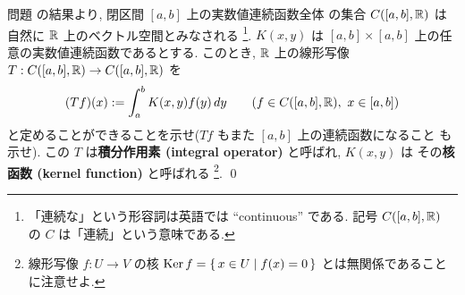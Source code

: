 \documentclass[12pt,twoside]{jarticle}
\begin{document}

\begin{question}[積分作用素]
  問題  の結果より, 閉区間 $[a,b]$ 上の実数値連続函数全体
  の集合 $C([a,b],{\mathbb R})$ は自然に ${\mathbb R}$ 上のベクトル空間とみなされる%
  \footnote{「連続な」という形容詞は英語では ``continuous'' である.
    記号 $C([a,b],{\mathbb R})$ の $C$ は「連続」という意味である.}.
  $K(x,y)$ は $[a,b]\times[a,b]$ 上の任意の実数値連続函数であるとする.
  このとき, ${\mathbb R}$ 上の線形写像 $T:C([a,b],{\mathbb R})\to C([a,b],{\mathbb R})$ を
  \begin{equation*}
    (Tf)(x) := \int_a^b K(x,y)f(y)\,dy
    \qquad (f\in C([a,b],{\mathbb R}),\ x\in [a,b])
  \end{equation*}
  と定めることができることを示せ($Tf$ もまた $[a,b]$ 上の連続函数になること
  も示せ).
  この $T$ は{\bf 積分作用素 (integral operator)} と呼ばれ, $K(x,y)$ は
  その{\bf 核函数 (kernel function)} と呼ばれる%
  \footnote{線形写像 $f:U\to V$ の核 $\mathop{\mathrm{Ker}}\nolimits f = \{\,x\in U\mid f(x)=0\,\}$ 
    とは無関係であることに注意せよ.}.
  \qed
\end{question}
\end{document}
